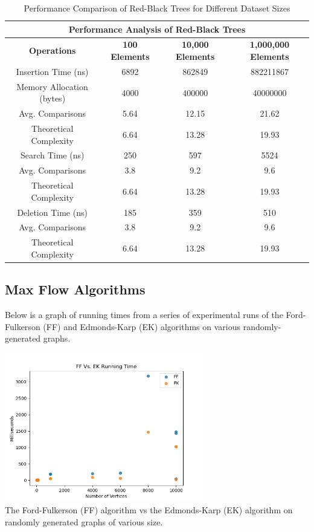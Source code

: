 \documentclass[12pt]{amsart}
\begin{document}
    \begin{table}[h]
        \centering
        \setlength{\tabcolsep}{6pt}
        \renewcommand{\arraystretch}{1.2}
        \begin{tabular}{|c|c|c|c|}
            \hline
            \multicolumn{4}{|c|}{\textbf{Performance Analysis of Red-Black Trees}} \\ \hline
            \textbf{Operations} & \textbf{100 Elements} & \textbf{10,000 Elements} & \textbf{1,000,000 Elements} \\ \hline
            Insertion Time (ns) & 6892 & 862849 & 882211867 \\
            Memory Allocation (bytes) & 4000 & 400000 & 40000000 \\
            Avg. Comparisons & 5.64 & 12.15 & 21.62 \\
            Theoretical Complexity & 6.64 & 13.28 & 19.93 \\ \hline
            Search Time (ns) & 250 & 597 & 5524 \\
            Avg. Comparisons & 3.8 & 9.2 & 9.6 \\
            Theoretical Complexity & 6.64 & 13.28 & 19.93 \\ \hline
            Deletion Time (ns) & 185 & 359 & 510 \\
            Avg. Comparisons & 3.8 & 9.2 & 9.6 \\
            Theoretical Complexity & 6.64 & 13.28 & 19.93 \\ \hline
        \end{tabular}
        \caption{Performance Comparison of Red-Black Trees for Different Dataset Sizes}
        \label{tab:rbt_performance}
    \end{table}

\subsection{Max Flow Algorithms}
    Below is a graph of running times from a series of
    experimental runs of the Ford-Fulkerson (FF) and
    Edmonds-Karp (EK) algorithms on various randomly-generated
    graphs.

\begin{center}
    \includegraphics[width=0.65\textwidth]
        {mf_algorithm_comparison} \\
    The Ford-Fulkerson (FF) algorithm vs the Edmonds-Karp (EK)
    algorithm on randomly generated graphs of various size. \\
    \vskip 1cm
\end{center}
\end{document}
